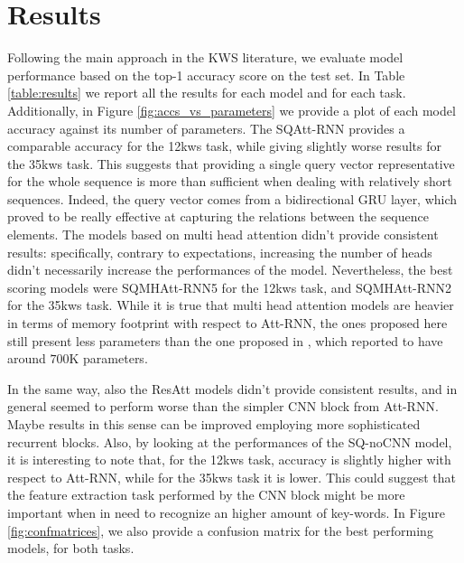 
\section{Results}
\label{sec:results}

Following the main approach in the KWS literature, we evaluate model performance based on the top-1 accuracy score on the test set. In Table \ref{table:results} we report all the results for each model and for each task. Additionally, in Figure \ref{fig:accs_vs_parameters} we provide a plot of each model accuracy against its number of parameters. The SQAtt-RNN provides a comparable accuracy for the 12kws task, while giving slightly worse results for the 35kws task. This suggests that providing a single query vector representative for the whole sequence is more than sufficient when dealing with relatively short sequences. Indeed, the query vector comes from a bidirectional GRU layer, which proved to be really effective at capturing the relations between the sequence elements. The models based on multi head attention didn't provide consistent results: specifically, contrary to expectations, increasing the number of heads didn't necessarily increase the performances of the model. Nevertheless, the best scoring models were SQMHAtt-RNN5 for the 12kws task, and SQMHAtt-RNN2 for the 35kws task. While it is true that multi head attention models are heavier in terms of memory footprint with respect to Att-RNN, the ones proposed here still present less parameters than the one proposed in \cite{streamingkws2020Rybakov}, which reported to have around $700$K parameters.

In the same way, also the ResAtt models didn't provide consistent results, and in general seemed to perform worse than the simpler CNN block from Att-RNN. Maybe results in this sense can be improved employing more sophisticated recurrent blocks. Also, by looking at the performances of the SQ-noCNN model, it is interesting to note that, for the 12kws task, accuracy is slightly higher with respect to Att-RNN, while for the 35kws task it is lower. This could suggest that the feature extraction task performed by the CNN block might be more important when in need to recognize an higher amount of key-words. In Figure \ref{fig:confmatrices}, we also provide a confusion matrix for the best performing models, for both tasks.

